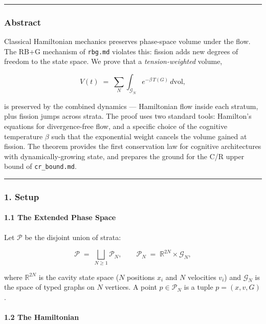 \documentclass[
  11pt,
  a4paper,
]{article}
\begin{document}
\begin{center}\rule{0.5\linewidth}{0.5pt}\end{center}

\subsubsection{Abstract}\label{abstract-5}

Classical Hamiltonian mechanics preserves phase-space volume under the
flow. The RB+G mechanism of \texttt{rbg.md} violates this: fission adds
new degrees of freedom to the state space. We prove that a
\emph{tension-weighted} volume,

\[
V(t) \;=\; \sum_{N} \int_{\mathcal{G}_N} e^{-\beta \, T(G)} \, d\text{vol},
\]

is preserved by the combined dynamics --- Hamiltonian flow inside each
stratum, plus fission jumps across strata. The proof uses two standard
tools: Hamilton's equations for divergence-free flow, and a specific
choice of the cognitive temperature \(\beta\) such that the exponential
weight cancels the volume gained at fission. The theorem provides the
first conservation law for cognitive architectures with
dynamically-growing state, and prepares the ground for the C/R upper
bound of \texttt{cr\_bound.md}.

\begin{center}\rule{0.5\linewidth}{0.5pt}\end{center}

\subsubsection{1. Setup}\label{setup-2}

\paragraph{1.1 The Extended Phase Space}\label{the-extended-phase-space}

Let \(\mathcal{P}\) be the disjoint union of strata:

\[
\mathcal{P} \;=\; \bigsqcup_{N \geq 1} \mathcal{P}_N, \qquad
\mathcal{P}_N \;=\; \mathbb{R}^{2N} \times \mathcal{G}_N,
\]

where \(\mathbb{R}^{2N}\) is the cavity state space (\(N\) positions
\(x_i\) and \(N\) velocities \(v_i\)) and \(\mathcal{G}_N\) is the space
of typed graphs on \(N\) vertices. A point \(p \in \mathcal{P}_N\) is a
tuple \(p = (x, v, G)\).

\paragraph{1.2 The Hamiltonian}\label{the-hamiltonian}
\end{document}
